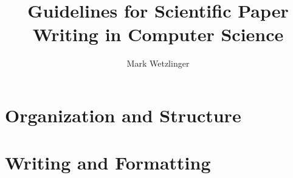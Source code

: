 \documentclass[a5paper,openany]{book}
\title{\huge Guidelines for Scientific Paper Writing in Computer Science}
\author{\Large Mark Wetzlinger}
\date{}
\begin{document}
\frontmatter

\maketitle




\tableofcontents







\mainmatter




\part{Organization and Structure}











\part{Writing and Formatting}









\backmatter


\printbibliography
\end{document}
